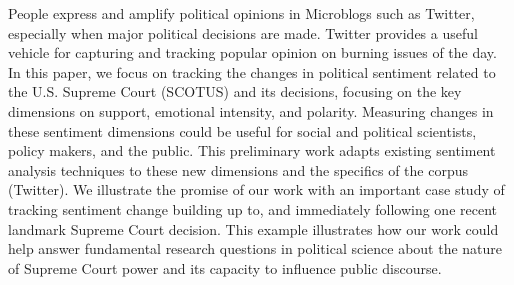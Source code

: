 People express and amplify political opinions in Microblogs such as Twitter, especially when major political decisions are made. Twitter provides a useful vehicle for capturing and tracking popular opinion on burning issues of the day. In this paper, we focus on tracking the changes in political sentiment related to the U.S. Supreme Court (SCOTUS) and its decisions, focusing on the key dimensions on support, emotional intensity, and polarity. Measuring changes in these sentiment dimensions could be useful for social and political scientists, policy makers, and the public. This preliminary work adapts existing sentiment analysis techniques to these new dimensions and the specifics of the corpus (Twitter). We illustrate the promise of our work with an important case study of tracking sentiment change building up to, and immediately following one recent landmark Supreme Court decision. This example illustrates how our work could help answer fundamental research questions in political science about the nature of Supreme Court power and its capacity to influence public discourse.
